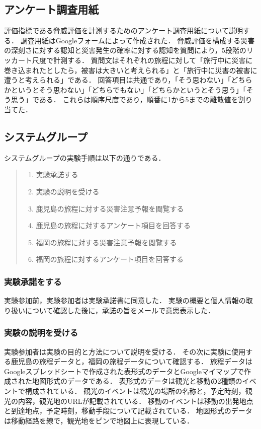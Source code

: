 \newpage

\subsection{アンケート調査用紙}
評価指標である脅威評価を計測するためのアンケート調査用紙について説明する．
調査用紙はGoogleフォームによって作成された．
脅威評価を構成する災害の深刻さに対する認知と災害発生の確率に対する認知を質問により，5段階のリッカート尺度で計測する．
質問文はそれぞれの旅程に対して「旅行中に災害に巻き込まれたとしたら，被害は大きいと考えられる」と「旅行中に災害の被害に遭うと考えられる」である．
回答項目は共通であり，「そう思わない」「どちらかというとそう思わない」「どちらでもない」「どちらかというとそう思う」「そう思う」である．
これらは順序尺度であり，順番に1から5までの離散値を割り当てた．


\subsection{システムグループ}
システムグループの実験手順は以下の通りである．

\begin{quote}
  \begin{enumerate}
    \item 実験承諾する
    \item 実験の説明を受ける
    \item 鹿児島の旅程に対する災害注意予報を閲覧する
    \item 鹿児島の旅程に対するアンケート項目を回答する
    \item 福岡の旅程に対する災害注意予報を閲覧する
    \item 福岡の旅程に対するアンケート項目を回答する
  \end{enumerate}
\end{quote}

\subsubsection{実験承諾をする}
実験参加前，実験参加者は実験承諾書に同意した．
実験の概要と個人情報の取り扱いについて確認した後に，承諾の旨をメールで意思表示した．

\subsubsection{実験の説明を受ける}
実験参加者は実験の目的と方法について説明を受ける．
その次に実験に使用する鹿児島の旅程データと，福岡の旅程データについて確認する．
旅程データはGoogleスプレッドシートで作成された表形式のデータとGoogleマイマップで作成された地図形式のデータである．
表形式のデータは観光と移動の2種類のイベントで構成されている．
観光のイベントは観光の場所の名称と，予定時刻，観光の内容，観光地のURLが記載されている．
移動のイベントは移動の出発地点と到達地点，予定時刻，移動手段について記載されている．
地図形式のデータは移動経路を線で，観光地をピンで地図上に表現している．

